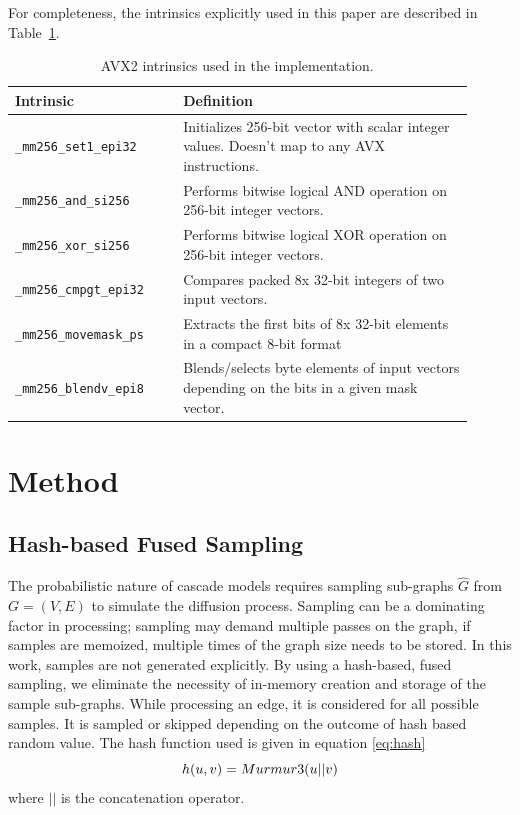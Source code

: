 \documentclass[10pt,journal,compsoc]{IEEEtran}
\begin{document}


For completeness, the intrinsics explicitly used in this paper are described in Table~\ref{tab:avx2-instructions}.

\begin{table}[!ht]
    \caption{AVX2 intrinsics used in the implementation.}
    \label{tab:avx2-instructions}
    \centering

    \begin{tabular}{|p{0.33\linewidth}|p{0.58\linewidth}|}
    \hline
    Intrinsic & Definition\\
    \hline
    {\tt \_mm256\_set1\_epi32} & Initializes 256-bit vector with scalar integer values. Doesn't map to any AVX instructions. \\
    {\tt \_mm256\_and\_si256} & Performs bitwise logical AND operation on 256-bit integer vectors. \\
    {\tt \_mm256\_xor\_si256} &  Performs bitwise logical XOR operation on 256-bit integer vectors.\\
    {\tt \_mm256\_cmpgt\_epi32} & Compares packed 8x 32-bit integers of two input vectors. \\
    {\tt \_mm256\_movemask\_ps} & Extracts the first bits of 8x 32-bit elements in a compact 8-bit format \\
    {\tt \_mm256\_blendv\_epi8} & Blends/selects byte elements of input vectors depending on the bits in a given mask vector.\\ 
             \hline         
    \end{tabular}
\end{table}{}

\section{Method}\label{sec:method}

\subsection{Hash-based Fused Sampling}
The probabilistic nature of cascade models requires sampling sub-graphs $\hat{G}$ from $G = (V, E)$ to simulate the diffusion process.  Sampling can be a dominating factor in processing; sampling may demand multiple passes on the graph, if samples are memoized, multiple times of the graph size needs to be stored.
In this work, samples are not generated explicitly. By using a hash-based, fused sampling, we eliminate the necessity of in-memory creation and storage of the sample sub-graphs.
While processing an edge, it is considered for all possible samples.
It is sampled or skipped depending on the outcome of hash based random value. The hash function used is given in equation \ref{eq:hash}
\begin{equation}
    \label{eq:hash}
    h(u,v) = \mbox{{\sc Murmur3}}(u||v)  
\end{equation}
where $||$ is the concatenation operator. 
\end{document}
